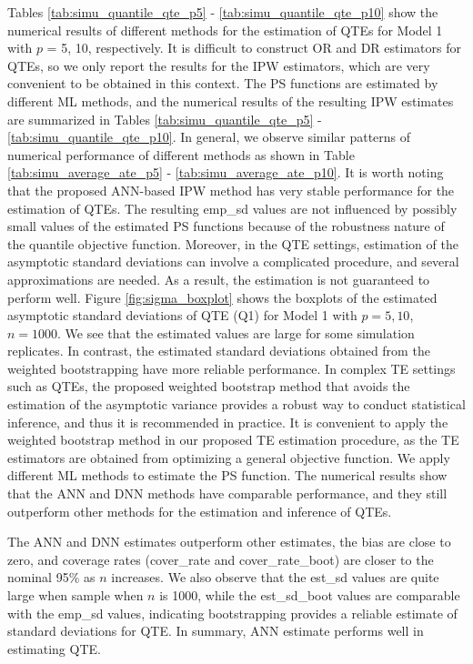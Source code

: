 \documentclass[11pt]{article}
\numberwithin{equation}{section}
\begin{document}
Tables \ref{tab:simu_quantile_qte_p5} -  \ref{tab:simu_quantile_qte_p10} show the numerical results of different methods for the estimation of QTEs for Model 1 with $p$ = 5, 10,  respectively. It is difficult to construct OR and DR estimators for QTEs, so we only report the results for the IPW estimators, which are very convenient to be obtained in this context. The PS functions are estimated by different ML methods, and the  numerical results of the resulting IPW estimates are summarized in Tables \ref{tab:simu_quantile_qte_p5} -  \ref{tab:simu_quantile_qte_p10}. In general, we observe similar patterns of numerical performance of different methods as shown in Table \ref{tab:simu_average_ate_p5} -  \ref{tab:simu_average_ate_p10}. It is worth noting that the proposed ANN-based IPW method has very stable performance for the estimation of QTEs. The resulting emp\_sd values are not influenced by possibly small values of the estimated PS functions because of the robustness nature of the quantile objective function. Moreover, in the QTE settings, estimation of the asymptotic standard deviations can involve a complicated procedure, and several approximations are needed. As a result, the estimation is not guaranteed to perform well. Figure \ref{fig:sigma_boxplot} shows the boxplots of the estimated asymptotic standard deviations of QTE (Q1) for Model 1 with $p=5,10$, $n=1000$. We see that the estimated values are large for some simulation replicates. In contrast, the estimated standard deviations obtained from the weighted bootstrapping have more reliable performance. In complex TE settings such as QTEs, the proposed weighted bootstrap method that avoids the estimation of the asymptotic variance provides a robust way to conduct statistical inference, and thus it is recommended in practice.  It is convenient to apply the weighted bootstrap method in our proposed TE estimation procedure, as the TE estimators are obtained from optimizing a general objective function. We apply different ML methods to estimate the PS function. The numerical results show that the ANN and DNN methods have comparable performance, and they still outperform other methods for the estimation and inference of QTEs.

\iffalse
The ANN and DNN estimates outperform other estimates, the bias are close to zero, and coverage rates  (cover\_rate and cover\_rate\_boot) are closer to the nominal 95\% as $n$ increases. We also observe that the est\_sd values are quite large when sample when $n$ is 1000, while the est\_sd\_boot values are comparable with the emp\_sd values, indicating bootstrapping provides a reliable estimate of standard deviations for QTE. In summary, ANN estimate performs well in estimating QTE.
\end{document}
